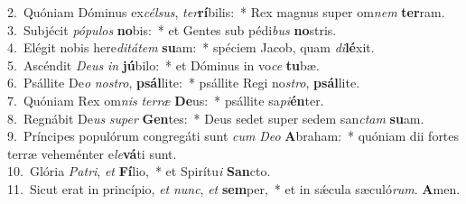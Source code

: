 {2.~}Quóniam Dóminus ex\textit{cél}\textit{sus}, \textit{ter}\textbf{rí}bilis:~* Rex magnus super om\textit{nem} \textbf{ter}ram.\\
{3.~}Subjécit \textit{pó}\textit{pu}\textit{los} \textbf{no}bis:~* et Gentes sub pédi\textit{bus} \textbf{no}stris.\\
{4.~}Elégit nobis here\textit{di}\textit{tá}\textit{tem} \textbf{su}am:~* spéciem Jacob, quam \textit{di}\textbf{lé}xit.\\
{5.~}Ascéndit \textit{De}\textit{us} \textit{in} \textbf{jú}bilo:~* et Dóminus in vo\textit{ce} \textbf{tu}bæ.\\
{6.~}Psállite De\textit{o} \textit{no}\textit{stro}, \textbf{psál}lite:~* psállite Regi no\textit{stro}, \textbf{psál}lite.\\
{7.~}Quóniam Rex om\textit{nis} \textit{ter}\textit{ræ} \textbf{De}us:~* psállite sa\textit{pi}\textbf{én}ter.\\
{8.~}Regnábit De\textit{us} \textit{su}\textit{per} \textbf{Gen}tes:~* Deus sedet super sedem san\textit{ctam} \textbf{su}am.\\
{9.~}Príncipes populórum congregáti sunt \textit{cum} \textit{De}\textit{o} \textbf{A}braham:~* quóniam dii fortes terræ veheménter e\textit{le}\textbf{vá}ti sunt.\\
{10.~}Glória \textit{Pa}\textit{tri}, \textit{et} \textbf{Fí}lio,~* et Spirítu\textit{i} \textbf{San}cto.\\
{11.~}Sicut erat in princípio, \textit{et} \textit{nunc}, \textit{et} \textbf{sem}per,~* et in sǽcula sæculó\textit{rum}. \textbf{A}men.\\
